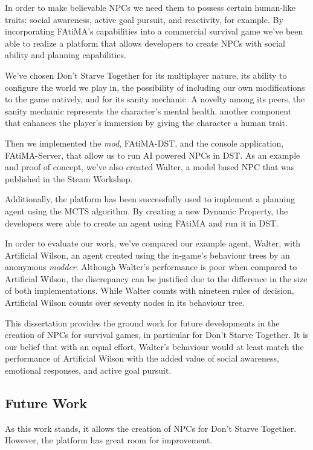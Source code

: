 In order to make believable NPCs we need them to possess certain human-like traits: social awareness, active goal pursuit, and reactivity, for example.
By incorporating FAtiMA's capabilities into a commercial survival game we've been able to realize a platform that allows developers to create NPCs with social ability and planning capabilities.

We've chosen Don't Starve Together for its multiplayer nature, its ability to configure the world we play in, the possibility of including our own modifications to the game natively, and for its sanity mechanic.
A novelty among its peers, the sanity mechanic represents the character's mental health, another component that enhances the player's immersion by giving the character a human trait.

Then we implemented the \textit{mod}, FAtiMA-DST, and the console application, FAtiMA-Server, that allow us to run AI powered NPCs in DST.
As an example and proof of concept, we've also created Walter, a model based NPC that was published in the Steam Workshop.

Additionally, the platform has been successfully used to implement a planning agent using the MCTS algorithm.
By creating a new Dynamic Property, the developers were able to create an agent using FAtiMA and run it in DST.

In order to evaluate our work, we've compared our example agent, Walter, with Artificial Wilson, an agent created using the in-game's behaviour trees by an anonymous \textit{modder}.
Although Walter's performance is poor when compared to Artificial Wilson, the discrepancy can be justified due to the difference in the size of both implementations.
While Walter counts with nineteen rules of decision, Artificial Wilson counts over seventy nodes in its behaviour tree.

This dissertation provides the ground work for future developments in the creation of NPCs for survival games, in particular for Don't Starve Together.
It is our belief that with an equal effort, Walter's behaviour would at least match the performance of Artificial Wilson with the added value of social awareness, emotional responses, and active goal pursuit.

\subsection{Future Work}

As this work stands, it allows the creation of NPCs for Don't Starve Together.
However, the platform has great room for improvement.

